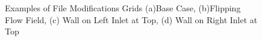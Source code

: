 \documentclass[12pt, oneside]{article}
\begin{document}
\begin{figure}[H]
\centering
{}

\caption{{\footnotesize Examples of File Modifications Grids (a)Base Case, (b)Flipping Flow Field, (c) Wall on Left Inlet at Top, (d) Wall on Right Inlet at Top}}
\label{fig: } 
\end{figure}
\end{document}
